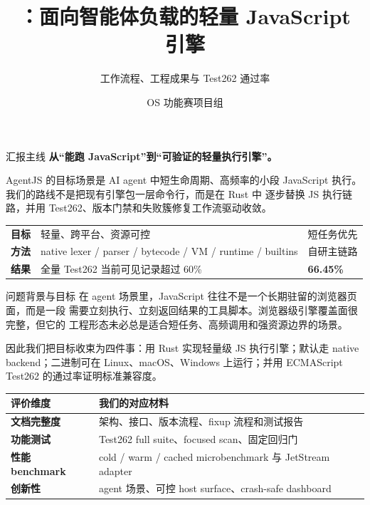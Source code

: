 \documentclass[aspectratio=169,UTF8,fontset=windows]{ctexbeamer}
\title[\ProjectName{} 工作流与成果]{\ProjectName{}：面向智能体负载的轻量 JavaScript 引擎}
\subtitle{工作流程、工程成果与 Test262 通过率}
\author{OS 功能赛项目组}
\institute{Rust native backend}
\date{\ReportDate}
\newcommand{\ProjectName}{AgentJS}
\newcommand{\FullPassRate}{66.45\%}
\newcommand{\leadtext}[1]{%
  {\large\bfseries #1}\par\vspace{0.35em}
}
\begin{document}
\begin{frame}
  \titlepage
\end{frame}

\begin{frame}{汇报主线}
  \leadtext{从“能跑 JavaScript”到“可验证的轻量执行引擎”。}

  \ProjectName{} 的目标场景是 AI agent 中短生命周期、高频率的小段
  JavaScript 执行。我们的路线不是把现有引擎包一层命令行，而是在 Rust 中
  逐步替换 JS 执行链路，并用 Test262、版本门禁和失败簇修复工作流驱动收敛。

  \vspace{0.8em}
  \begin{tabularx}{\textwidth}{>{\bfseries}p{} X >{\raggedleft\arraybackslash}p{}}
    \toprule
    目标 & 轻量、跨平台、资源可控 & 短任务优先 \\
    方法 & native lexer / parser / bytecode / VM / runtime / builtins & 自研主链路 \\
    结果 & 全量 Test262 当前可见记录超过 60\% & {\Large\bfseries \FullPassRate} \\
    \bottomrule
  \end{tabularx}
\end{frame}

\begin{frame}{问题背景与目标}
  在 agent 场景里，JavaScript 往往不是一个长期驻留的浏览器页面，而是一段
  需要立刻执行、立刻返回结果的工具脚本。浏览器级引擎覆盖面很完整，但它的
  工程形态未必总是适合短任务、高频调用和强资源边界的场景。

  \vspace{0.6em}
  因此我们把目标收束为四件事：用 Rust 实现轻量级 JS 执行引擎；默认走
  native backend；二进制可在 Linux、macOS、Windows 上运行；并用
  ECMAScript Test262 的通过率证明标准兼容度。

  \vspace{0.8em}
  \begin{tabularx}{\textwidth}{>{\bfseries}p{} X}
    \toprule
    评价维度 & 我们的对应材料 \\
    \midrule
    文档完整度 & 架构、接口、版本流程、fixup 流程和测试报告 \\
    功能测试 & Test262 full suite、focused scan、固定回归门 \\
    性能 benchmark & cold / warm / cached microbenchmark 与 JetStream adapter \\
    创新性 & agent 场景、可控 host surface、crash-safe dashboard \\
    \bottomrule
  \end{tabularx}
\end{frame}
\end{document}

